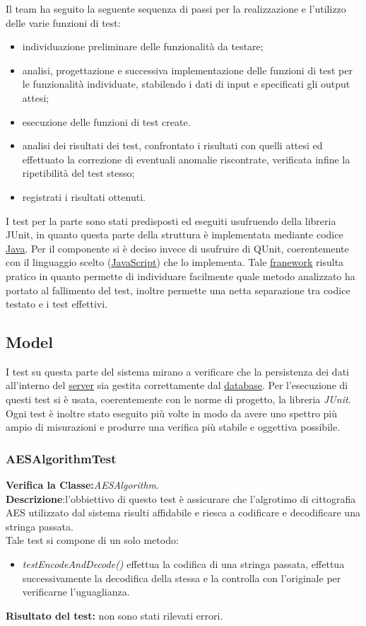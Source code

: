 Il team ha seguito la seguente sequenza di passi per la realizzazione e l'utilizzo delle varie funzioni di test:
\begin{itemize}
\item individuazione preliminare delle funzionalità da testare;
\item analisi, progettazione e successiva implementazione delle funzioni di test per le funzionalità individuate, stabilendo i dati di input e specificati gli output attesi;
\item esecuzione delle funzioni di test create.
\item analisi dei risultati dei test, confrontato i risultati con quelli attesi ed effettuato la correzione di eventuali anomalie riscontrate, verificata infine la ripetibilità del test stesso;
\item registrati i risultati ottenuti.
\end{itemize}

I test per la parte  sono stati predisposti ed eseguiti usufruendo della libreria JUnit, in quanto questa parte della struttura è implementata mediante codice \underline{Java}.
Per il componente  si è deciso invece di usufruire di QUnit, coerentemente con il linguaggio scelto (\underline{JavaScript}) che lo implementa. Tale \underline{franework} risulta pratico in quanto permette di individuare facilmente quale metodo analizzato ha portato al fallimento del test, inoltre permette una netta separazione tra codice testato e i test effettivi.

\subsection{Model}
I test su questa parte del sistema mirano a verificare che la persistenza dei dati all'interno del \underline{server} sia gestita correttamente dal \underline{database}.
Per l'esecuzione di questi test si è usata, coerentemente con le norme di progetto, la libreria \textit{JUnit}.
Ogni test è inoltre stato eseguito più volte in modo da avere uno spettro più ampio di misurazioni e produrre una verifica più stabile e oggettiva possibile.

\subsubsection{AESAlgorithmTest}
\textbf{Verifica la Classe:}\textit{AESAlgorithm}.\\
\textbf{Descrizione}:l'obbiettivo di questo test è assicurare che l'algrotimo di cittografia AES utilizzato dal sistema \caName risulti affidabile e riesca a codificare e decodificare una stringa passata.\\
Tale test si compone di un solo metodo:
\begin{itemize}
\item \textit{testEncodeAndDecode() } effettua la codifica di una stringa passata, effettua successivamente la decodifica della stessa e la controlla con l'originale per verificarne l'uguaglianza.
\end{itemize}
\textbf{Risultato del test:} non sono stati rilevati errori.

